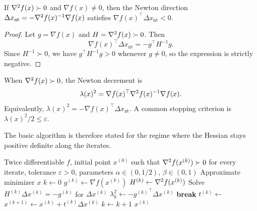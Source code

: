 \begin{lemma}
If $\nabla^2 f(x) \succ 0$ and $\nabla f(x)\neq 0$, then the Newton direction $\Delta x_{\mathrm{nt}}=-\nabla^2 f(x)^{-1}\nabla f(x)$ satisfies $\nabla f(x)^\top \Delta x_{\mathrm{nt}} < 0$.
\end{lemma}
\begin{proof}
Let $g=\nabla f(x)$ and $H=\nabla^2 f(x)\succ 0$.
Then
\[
\nabla f(x)^\top \Delta x_{\mathrm{nt}}
= -g^\top H^{-1} g.
\]
Since $H^{-1}\succ 0$, we have $g^\top H^{-1}g>0$ whenever $g\neq 0$, so the expression is strictly negative.
\end{proof}

\begin{definition}
When $\nabla^2 f(x)\succ 0$, the Newton decrement is
\begin{equation}
  \lambda(x)^2 = \nabla f(x)^\top \nabla^2 f(x)^{-1}\nabla f(x).
  \label{eq:newton-decrement}
\end{equation}
Equivalently, $\lambda(x)^2 = -\nabla f(x)^\top \Delta x_{\mathrm{nt}}$.
A common stopping criterion is $\lambda(x)^2/2 \le \varepsilon$.
\end{definition}

The basic algorithm is therefore stated for the regime where the Hessian stays positive definite along the iterates.

\begin{algorithm}
  \caption{Newton's method with backtracking line search}
  \label{alg:newton-backtracking}
  \begin{algorithmic}[1]
    \Require Twice differentiable $f$, initial point $x^{(0)}$ such that $\nabla^2 f(x^{(k)})\succ 0$ for every iterate, tolerance $\varepsilon>0$, parameters $\alpha \in (0,1/2)$, $\beta \in (0,1)$
    \Ensure Approximate minimizer $x$
    \State $k \gets 0$
      \State $g^{(k)} \gets \nabla f(x^{(k)})$
      \State $H^{(k)} \gets \nabla^2 f(x^{(k)})$
      \State Solve $H^{(k)}\Delta x^{(k)} = -g^{(k)}$ for $\Delta x^{(k)}$ 
      \State $\lambda_k^2 \gets -{g^{(k)}}^\top \Delta x^{(k)}$ 
        \State \textbf{break}
      \EndIf
      \State $t^{(k)} \gets$  
      \State $x^{(k+1)} \gets x^{(k)} + t^{(k)}\Delta x^{(k)}$
      \State $k \gets k + 1$
    \EndWhile
    \State \Return $x^{(k)}$
  \end{algorithmic}
\end{algorithm}

